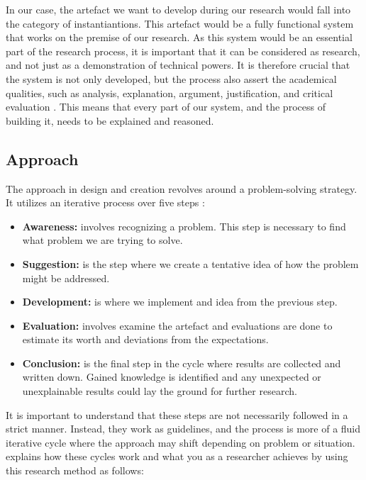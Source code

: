 In our case, the artefact we want to develop during our research would fall into the category of instantiantions. This artefact would be a fully functional system that works on the premise of our research.  As this system would be an essential part of the research process, it is important that it can be considered as research, and not just as a demonstration of technical powers. It is therefore crucial that the system is not only developed, but the process also assert the academical qualities, such as analysis, explanation, argument, justification, and critical evaluation \citep{oates2005researching}. This means that every part of our system, and the process of building it, needs to be explained and reasoned.

\subsection{Approach}
\label{methodology-design-and-creation-approach}
The approach in design and creation revolves around a problem-solving strategy. It utilizes an iterative process over five steps \citep{vaishnavi2004design, oates2005researching}:

\begin{itemize}
    \item\textbf{Awareness:} involves recognizing a problem. This step is necessary to find what problem we are trying to solve.
    \item\textbf{Suggestion:} is the step where we create a tentative idea of how the problem might be addressed.
    \item\textbf{Development:} is where we implement and idea from the previous step.
    \item\textbf{Evaluation:} involves examine the artefact and evaluations are done to estimate its worth and deviations from the expectations.
    \item\textbf{Conclusion:} is the final step in the cycle where results are collected and written down. Gained knowledge is identified and any unexpected or unexplainable results could lay the ground for further research.
\end{itemize}

It is important to understand that these steps are not necessarily followed in a strict manner. Instead, they work as guidelines, and the process is more of a fluid iterative cycle where the approach may shift depending on problem or situation. \citep{oates2005researching} explains how these cycles work and what you as a researcher achieves by using this research method as follows:


